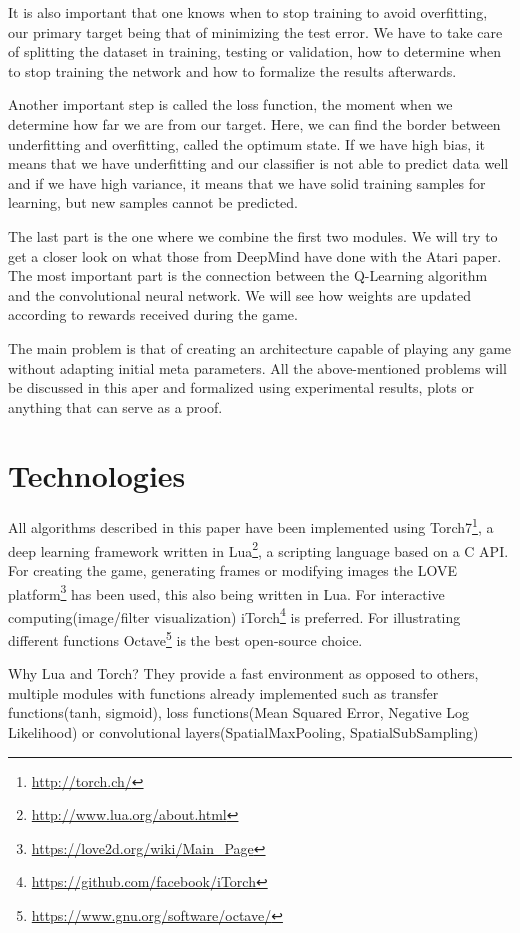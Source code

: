 It is also important that one knows when to stop training to avoid overfitting, our primary target being that of minimizing the test error. We have to take care of splitting the dataset in training, testing or validation, how to determine when to stop training the network and how to formalize the results afterwards.

Another important step is called the loss function, the moment when we determine how far we are from our target. Here, we can find the border between underfitting and overfitting, called the optimum state. If we have high bias, it means that we have underfitting and our classifier is not able to predict data well and if we have high variance, it means that we have solid training samples for learning, but new samples cannot be predicted.

The last part is the one where we combine the first two modules. We will try to get a closer look on what those from DeepMind have done with the Atari paper\cite{atari}. The most important part is the connection between the Q-Learning algorithm and the convolutional neural network. We will see how weights are updated according to rewards received during the game.

The main problem is that of creating an architecture capable of playing any game without adapting initial meta parameters. All the above-mentioned problems will be discussed in this aper and formalized using experimental results, plots or anything that can serve as a proof.
\newpage

\section{Technologies}
\label{sec:technologies}
All algorithms described in this paper have been implemented using Torch7\footnote{\url{http://torch.ch/}}, a deep learning framework written in Lua\footnote{\url{http://www.lua.org/about.html}}, a scripting language based on a C API. For creating the game, generating frames or modifying images the LOVE platform\footnote{\url{https://love2d.org/wiki/Main_Page}} has been used, this also being written in Lua.  For interactive computing(image/filter visualization) iTorch\footnote{\url{https://github.com/facebook/iTorch}} is preferred. For illustrating different functions Octave\footnote{\url{https://www.gnu.org/software/octave/}} is the best open-source choice.

Why Lua and Torch? They provide a fast environment as opposed to others\cite{torch7}, multiple modules with functions already implemented such as transfer functions(tanh, sigmoid), loss functions(Mean Squared Error, Negative Log Likelihood) or convolutional layers(SpatialMaxPooling, SpatialSubSampling)

